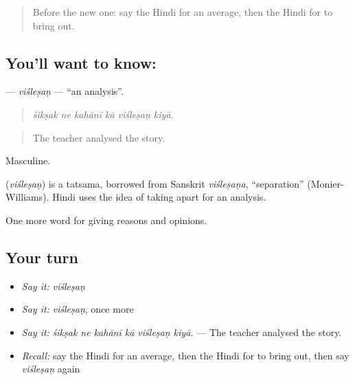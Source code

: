 \label{lesson:HI-C362-vislesan}



\begin{quote}
Before the new one: say the Hindi for an average, then the Hindi for to bring out.
\end{quote}

\subsection*{You'll want to know: }
\textbf{} — \emph{viśleṣaṇ} — \textquotedblleft{}an analysis\textquotedblright{}.

\begin{quote}
     
\end{quote}

\begin{quote}
\emph{śikṣak ne kahānī kā viśleṣaṇ kiyā.}
\end{quote}

\begin{quote}
The teacher analysed the story.
\end{quote}

Masculine.

\begin{cousinweb}
\textbf{} (\emph{viśleṣaṇ}) is a tatsama, borrowed from Sanskrit \emph{viśleṣaṇa}, \textquotedblleft{}separation\textquotedblright{} (Monier-Williams). Hindi uses the idea of taking apart for an analysis.
\end{cousinweb}

\begin{grammarlens}[title={What you've built}]
One more word for giving reasons and opinions.
\end{grammarlens}

\subsection*{Your turn}
\begin{itemize}
\raggedright
  \item \emph{Say it:} \emph{viśleṣaṇ}
  \item \emph{Say it:} \emph{viśleṣaṇ}, once more
  \item \emph{Say it:} \emph{śikṣak ne kahānī kā viśleṣaṇ kiyā.} — The teacher analysed the story.
  \item \emph{Recall:} say the Hindi for an average, then the Hindi for to bring out, then say \emph{viśleṣaṇ} again
\end{itemize}

